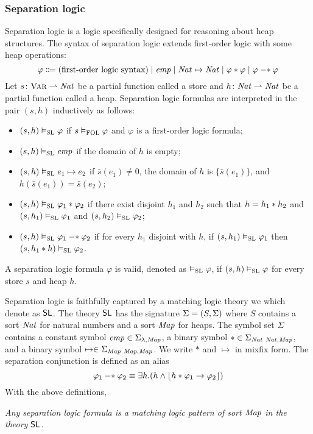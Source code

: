 \documentclass{amsart}
\begin{document}
\subsubsection{Separation logic}
\label{sec_separation_logic}

Separation logic is a logic specifically designed for reasoning about
heap structures.
The syntax of separation logic extends first-order logic with
some heap operations:
\begin{equation*}
\varphi \Coloneqq
\text{(first-order logic syntax)}
\mid \emp \mid \Nat \mapsto \Nat \mid \varphi \merge \varphi
\mid \varphi \simp \varphi
\end{equation*}
Let $s \colon \Var \pto \Nat$ be a partial function called a store
and $h \colon \Nat \pto \Nat$ be a partial function called a heap.
Separation logic formulas are interpreted in the pair $(s,h)$
inductively as follows:
\begin{itemize}
\item $(s,h) \vDash_{\SL} \varphi$
      if $s \vDash_{\FOL} \varphi$ and $\varphi$ is a first-order logic formula;
\item $(s,h) \vDash_\SL \emp$ if the domain of $h$ is empty;
\item $(s,h) \vDash_\SL e_1 \mapsto e_2$
      if $\bar{s}(e_1) \neq 0$, the domain of $h$ is $\{ \bar{s}(e_1) \}$, and 
      $h( \bar{s}(e_1) ) = \bar{s}(e_2)$;
\item $(s,h) \vDash_\SL \varphi_1 \merge \varphi_2$ if
      there exist disjoint $h_1$ and $h_2$ such that
      $h = h_1 \merge h_2$ and
      $(s,h_1) \vDash_\SL \varphi_1$
      and $(s, h_2) \vDash_\SL \varphi_2$;
\item $(s,h) \vDash_\SL \varphi_1 \simp \varphi_2$ if
      for every $h_1$ disjoint with $h$,
      if $(s,h_1) \vDash_\SL \varphi_1$ then
      $(s,h_1 \merge h) \vDash_\SL \varphi_2$.
\end{itemize}
A separation logic formula $\varphi$ is valid,
denoted as $\vDash_\SL \varphi$,
if $(s,h)\vDash_\SL \varphi$ for every store $s$ and heap $h$.

Separation logic is faithfully captured by a matching logic theory
we which denote as $\MLSL$.
The theory $\MLSL$ has the signature
$\sig = (S, \Sigma)$ 
where $S$ contains a sort $\Nat$ for natural numbers and
a sort $\Map$ for heaps. 
The symbol set $\Sigma$ contains
a constant symbol $\emp \in \Sigma_{\lambda,\Map}$,
a binary symbol $* \in \Sigma_{\Nat\ \Nat,\Map}$,
and a binary symbol $\mapsto \in \Sigma_{\Map\ \Map,\Map}$.
We write $*$ and $\mapsto$ in mixfix form.
The separation conjunction is defined as an alias
\begin{equation*}
\varphi_1 \simp \varphi_2 \equiv
\exists h . ( h \wedge \floor{ h \merge \varphi_1 \imp \varphi_2 } )
\end{equation*}
With the above definitions,
\begin{center}
\em Any separation logic formula is a matching logic pattern of sort $\Map$
in the theory $\MLSL$.
\end{center}
\end{document}
